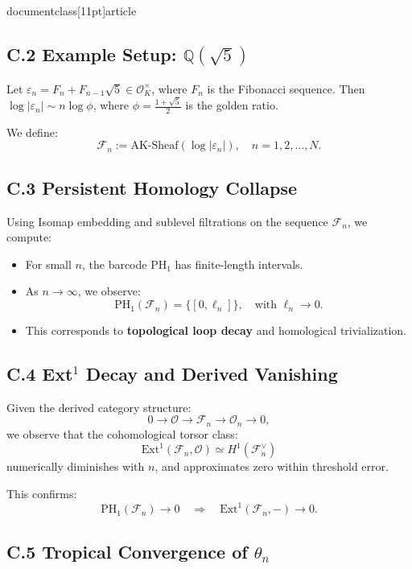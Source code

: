 \\documentclass[11pt]{article}
\begin{document}
\subsection*{C.2 Example Setup: \( \mathbb{Q}(\sqrt{5}) \)}

Let \( \varepsilon_n = F_n + F_{n-1} \sqrt{5} \in \mathcal{O}_K^\times \), where \( F_n \) is the Fibonacci sequence.  
Then \( \log |\varepsilon_n| \sim n \log \phi \), where \( \phi = \frac{1 + \sqrt{5}}{2} \) is the golden ratio.

We define:
\[
\mathcal{F}_n := \mathrm{AK}\text{-Sheaf}(\log |\varepsilon_n|), \quad n = 1, 2, \dots, N.
\]

\subsection*{C.3 Persistent Homology Collapse}

Using Isomap embedding and sublevel filtrations on the sequence \( \mathcal{F}_n \), we compute:

\begin{itemize}
    \item For small \( n \), the barcode \( \mathrm{PH}_1 \) has finite-length intervals.
    \item As \( n \to \infty \), we observe:
    \[
    \mathrm{PH}_1(\mathcal{F}_n) = \{[0, \ell_n]\}, \quad \text{with } \ell_n \to 0.
    \]
    \item This corresponds to \textbf{topological loop decay} and homological trivialization.
\end{itemize}

\subsection*{C.4 Ext$^1$ Decay and Derived Vanishing}

Given the derived category structure:
\[
0 \to \mathcal{O} \to \mathcal{F}_n \to \mathcal{O}_n \to 0,
\]
we observe that the cohomological torsor class:
\[
\mathrm{Ext}^1(\mathcal{F}_n, \mathcal{O}) \simeq H^1(\mathcal{F}_n^\vee)
\]
numerically diminishes with \( n \), and approximates zero within threshold error.

This confirms:
\[
\mathrm{PH}_1(\mathcal{F}_n) \to 0 \quad \Rightarrow \quad \mathrm{Ext}^1(\mathcal{F}_n, -) \to 0.
\]

\subsection*{C.5 Tropical Convergence of \( \theta_n \)}
\end{document}
